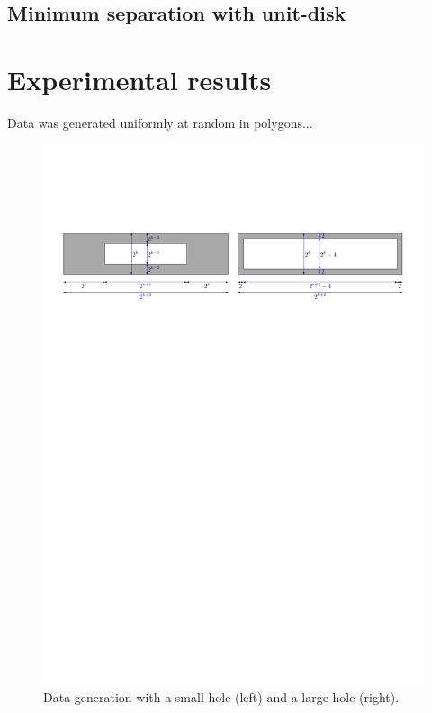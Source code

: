 \documentclass[a4paper,USenglish,numberwithinsect]{lipics}
\begin{document}
\subsection{Minimum separation with unit-disk}
\label{sec:implementation-separation}



\section{Experimental results}
\label{sec:experiments}

Data was generated uniformly at random in polygons...


\begin{figure}
	\includegraphics[width=\textwidth,page=1]{data_generation}
	\caption{Data generation with a small hole (left) and a large hole (right).}
	\label{fig:data_generation}
\end{figure}
\end{document}
